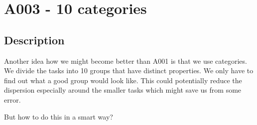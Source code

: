 \newpage{}

\hypertarget{a003---10-categories}{%
\section{A003 - 10 categories}\label{a003---10-categories}}

\hypertarget{description}{%
\subsection{Description}}

Another idea how we might become better than A001 is that we use
categories. We divide the tasks into 10 groups that have distinct
properties. We only have to find out what a good group would look like.
This could potentially reduce the dispersion especially around the
smaller tasks which might save us from some error.

But how to do this in a smart way?
